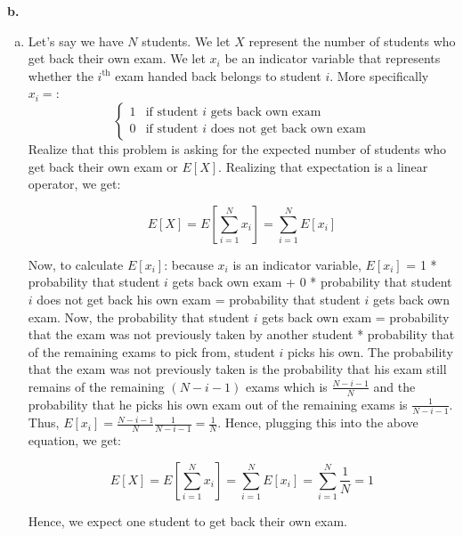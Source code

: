 \documentclass[12 pt]{article}
\begin{document}
	\noindent \textbf {b.} 
	\begin{enumerate}[a.]
	\item Let's say we have $N$ students. We let $X$ represent the number of students who get back their own exam. We let $x_i$ be an indicator variable that represents whether the $i^{\text{th}}$ exam handed back belongs to student $i$. More specifically $x_i = $:
	\[ \begin{cases} 
	1 & \text{if student $i$ gets back own exam} \\
	0 & \text{if student $i$ does not get back own exam}
	\end{cases}
	\]
	\noindent Realize that this problem is asking for the expected number of students who get back their own exam or $E[X]$. Realizing that expectation is a linear operator, we get:
	
	\begin{equation}
	E[X] = E[\sum_{i=1}^N x_i] = \sum_{i=1}^N E[x_i]
	\end{equation}
	
	\noindent Now, to calculate $E[x_i]$: because $x_i$ is an indicator variable, $E[x_i]$ = 1 * probability that student $i$ gets back own exam + 0 * probability that student $i$ does not get back his own exam = probability that student $i$ gets back own exam. Now, the probability that student $i$ gets back own exam = probability that the exam was not previously taken by another student * probability that of the remaining exams to pick from, student $i$ picks his own. The probability that the exam was not previously taken is the probability that his exam still remains of the remaining $(N-i-1)$ exams which is $\frac{N-i-1}{N}$ and the probability that he picks his own exam out of the remaining exams is $\frac{1}{N-i-1}$. Thus, $E[x_i] = \frac{N-i-1}{N} \frac{1}{N-i-1} = \frac{1}{N}$. Hence, plugging this into the above equation, we get:
	
	\begin{equation}
	E[X] = E[\sum_{i=1}^N x_i] = \sum_{i=1}^N E[x_i] = \sum_{i=1}^N \frac{1}{N} = 1
	\end{equation}
	
	\noindent Hence, we expect one student to get back their own exam.
	

\end{enumerate}
\end{document}
